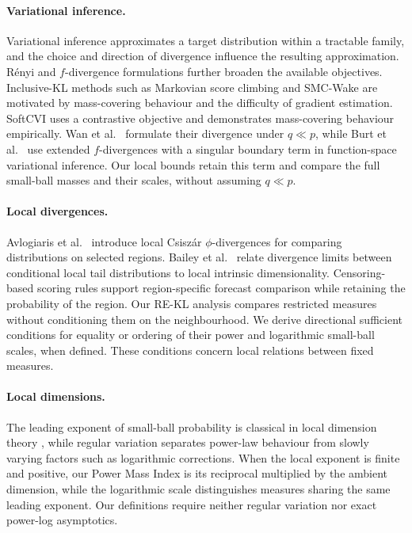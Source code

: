 \documentclass[11pt,a4paper]{article}
\theoremstyle{compactplain}
\theoremstyle{compactdefinition}
\numberwithin{equation}{section}
\begin{document}
\paragraph{Variational inference.}%
Variational inference \cite{blei2017variational} approximates a target distribution within a tractable family, and the choice and direction of divergence \cite{minka2005divergence} influence the resulting approximation. R\'enyi \cite{li_renyi_2016} and $f$-divergence formulations \cite{wan2020f,zhang_variational_2024} further broaden the available objectives. Inclusive-KL methods such as Markovian score climbing \cite{naesseth2020markovian} and SMC-Wake \cite{mcnamara_sequential_2024} are motivated by mass-covering behaviour and the difficulty of gradient estimation. SoftCVI \cite{ward2025softcvi} uses a contrastive objective and demonstrates mass-covering behaviour empirically. Wan et al.\ \cite[Section~2.1]{wan2020f} formulate their divergence under \(q\ll p\), while Burt et al.\ \cite[Appendix~B]{burt2021understanding} use extended \(f\)-divergences with a singular boundary term in function-space variational inference. Our local bounds retain this term and compare the full small-ball masses and their scales, without assuming \(q\ll p\).

\paragraph{Local divergences.}%
Avlogiaris et al.\ \cite{avlogiaris2016local} introduce local Csisz\'ar $\phi$-divergences for comparing distributions on selected regions. Bailey et al.\ \cite{bailey2022local} relate divergence limits between conditional local tail distributions to local intrinsic dimensionality. Censoring-based scoring rules \cite{depunder2026localizing} support region-specific forecast comparison while retaining the probability of the region. Our RE-KL analysis compares restricted measures without conditioning them on the neighbourhood. We derive directional sufficient conditions for equality or ordering of their power and logarithmic small-ball scales, when defined. These conditions concern local relations between fixed measures.

\paragraph{Local dimensions.}%
The leading exponent of small-ball probability is classical in local dimension theory \cite{heurteaux2007dimension}, while regular variation \cite{bingham1989regular} separates power-law behaviour from slowly varying factors such as logarithmic corrections. When the local exponent is finite and positive, our Power Mass Index is its reciprocal multiplied by the ambient dimension, while the logarithmic scale distinguishes measures sharing the same leading exponent. Our definitions require neither regular variation nor exact power-log asymptotics.
\end{document}
